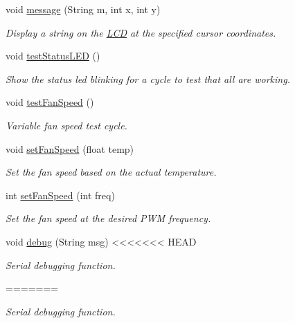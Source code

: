 \begin{DoxyCompactItemize}
void \hyperlink{_meditech___chip_kit_control_panel_8pde_ae1956b5b6310b3339e72931911b84e3f}{message} (String m, int x, int y)
\begin{DoxyCompactList}\small\item\em Display a string on the \hyperlink{class_l_c_d}{L\-C\-D} at the specified cursor coordinates. \end{DoxyCompactList}\item 
void \hyperlink{_meditech___chip_kit_control_panel_8pde_af1a6bbf84a5ea76623bdc49aaf642a28}{test\-Status\-L\-E\-D} ()
\begin{DoxyCompactList}\small\item\em Show the status led blinking for a cycle to test that all are working. \end{DoxyCompactList}\item 
void \hyperlink{_meditech___chip_kit_control_panel_8pde_a697689ffa626676db9a1abb5e6662762}{test\-Fan\-Speed} ()
\begin{DoxyCompactList}\small\item\em Variable fan speed test cycle. \end{DoxyCompactList}\item 
void \hyperlink{_meditech___chip_kit_control_panel_8pde_ac0f1975168c58bd48fc29f8e3004a5a8}{set\-Fan\-Speed} (float temp)
\begin{DoxyCompactList}\small\item\em Set the fan speed based on the actual temperature. \end{DoxyCompactList}\item 
int \hyperlink{_meditech___chip_kit_control_panel_8pde_aac6d40e9f46456f3b2d16f2fe64004cc}{set\-Fan\-Speed} (int freq)
\begin{DoxyCompactList}\small\item\em Set the fan speed at the desired P\-W\-M frequency. \end{DoxyCompactList}\item 
void \hyperlink{_meditech___chip_kit_control_panel_8pde_ad5b3677e61ca769d9d9e5cf9cfa1b33c}{debug} (String msg)
<<<<<<< HEAD
\begin{DoxyCompactList}\small\item\em Serial debugging function. \end{DoxyCompactList}\end{DoxyCompactItemize}
=======
\begin{DoxyCompactList}\small\item\em Serial debugging function. \end{DoxyCompactList}\item 
